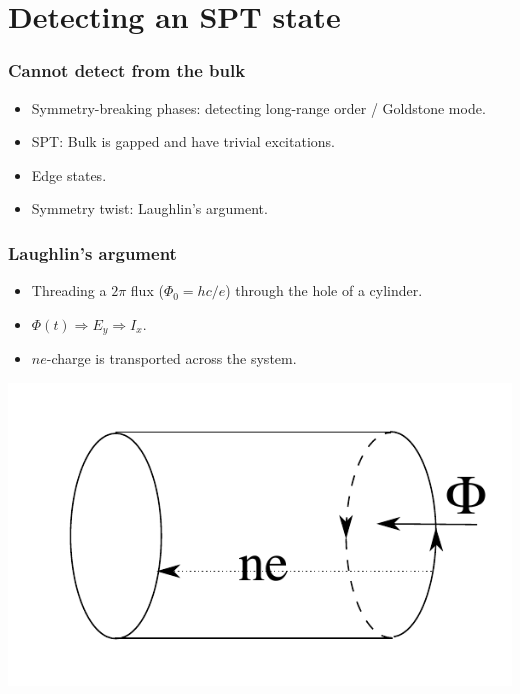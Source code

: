 \documentclass[xcolor=table, aspectratio=43,ignorenonframetext]{beamer}
\begin{document}
\section{Detecting an SPT state}

\begin{frame}
	\frametitle{Cannot detect from the bulk}
	\begin{itemize}
		\item Symmetry-breaking phases: detecting long-range order / Goldstone mode.
		\item SPT: Bulk is gapped and have trivial excitations.
		\item Edge states.
		\item Symmetry twist: Laughlin's argument.
	\end{itemize}
	\begin{center}
	\end{center}
\end{frame}

\begin{frame}
	\frametitle{Laughlin's argument}
	\begin{itemize}
		\item Threading a $2\pi$ flux ($\Phi_0 = hc/e$) through the hole of a cylinder.
		\item $\Phi(t)\Rightarrow E_y\Rightarrow I_x$.
		\item $ne$-charge is transported across the system.
	\end{itemize}
	\includegraphics{laughlin}
\end{frame}
\end{document}
